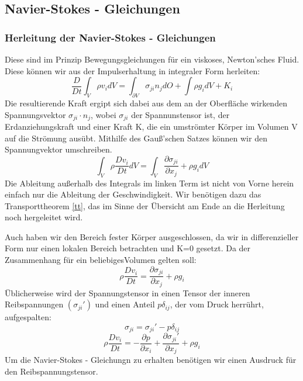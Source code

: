 \documentclass[
	11pt, %
]{beamer}
\begin{document}
		\subsection{Navier-Stokes - Gleichungen}
\begin{frame}
	\frametitle{Herleitung der Navier-Stokes - Gleichungen}
	Diese sind im Prinzip Bewegungsgleichungen f\"ur ein viskoses, Newton'sches Fluid. Diese k\"onnen wir aus der Impulserhaltung in integraler Form herleiten:
	\begin{equation}
		\frac{D}{Dt}\int_V \rho v_i dV=\int_{\partial V}\sigma_{ji}n_j dO+\int \rho g_i dV + K_i
	\end{equation}
		Die resultierende Kraft ergipt sich dabei aus dem an der Oberfl\"ache wirkenden Spannungsvektor $\sigma_{ji}\cdot n_j$, wobei $\sigma_{ji}$ der Spannunstensor ist, der Erdanziehungskraft und einer Kraft K, die ein umstr\"omter K\"orper im Volumen V auf die Str\"omung aus\"ubt. Mithilfe des Gau{\ss}'schen Satzes k\"onnen wir den Spannungvektor umschreiben.
		\begin{equation}
			\int_V \rho \frac{Dv_i}{Dt} dV=\int_{V}\frac{\partial \sigma_{ji}}{\partial x_j} +\rho g_i dV
		\end{equation}
    Die Ableitung au{\ss}erhalb des Integrals im linken Term ist nicht von Vorne herein einfach nur die Ableitung der Geschwindigkeit. Wir ben\"otigen dazu das Transporttheorem \eqref{tt}, das im Sinne der \"Ubersicht am Ende an die Herleitung noch hergeleitet wird.
\end{frame}
\begin{frame}
	Auch haben wir den Bereich fester K\"orper ausgeschlossen, da wir in differenzieller Form nur einen lokalen Bereich betrachten und K=0 gesetzt. Da der Zusammenhang f\"ur ein beliebigesVolumen gelten soll:
	\begin{equation}
			\rho \frac{Dv_i}{Dt} =\frac{\partial \sigma_{ji}}{\partial x_j} +\rho g_i 
	\end{equation}
	\"Ublicherweise wird der Spannungstensor in einen Tensor der inneren Reibspannungen $\left(\sigma_{ji}'\right)$ und einen Anteil $p\delta_{ij}$, der vom Druck herr\"uhrt, aufgespalten:
	\begin{equation}
		\sigma_{ji}=\sigma_{ji}'-p\delta_{ij}
	\end{equation}
	\begin{equation}
		\rho \frac{Dv_i}{Dt} =-\frac{\partial p}{\partial x_i}+\frac{\partial \sigma_{ji}'}{\partial x_j} +\rho g_i 
	\end{equation}
	Um die Navier-Stokes - Gleichungn zu erhalten ben\"otigen wir einen Ausdruck f\"ur den Reibspannungstensor.
\end{frame}
\end{document}

